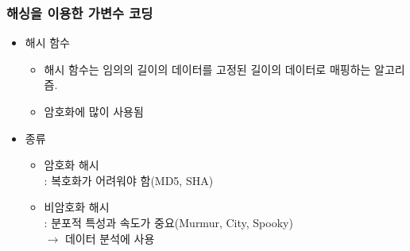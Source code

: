 \documentclass{beamer}
\begin{document}
\begin{frame}
\frametitle{해싱을 이용한 가변수 코딩}
\begin{itemize}
    \item 해시 함수
    {\footnotesize
    \begin{itemize}
    [circle]
    \item 해시 함수는 임의의 길이의 데이터를 고정된 길이의 데이터로 매핑하는 알고리즘.
    \item 암호화에 많이 사용됨
    \end{itemize}
    }

    \item 종류
    {\footnotesize
    \begin{itemize}
    [circle]
    \item 암호화 해시
        \\: 복호화가 어려워야 함(MD5, SHA)
    \item 비암호화 해시
        \\: 분포적 특성과 속도가 중요(Murmur, City, Spooky)
        \\\quad $\rightarrow$ 데이터 분석에 사용
    \end{itemize}
    }
\end{itemize}
\end{frame}
\end{document}
